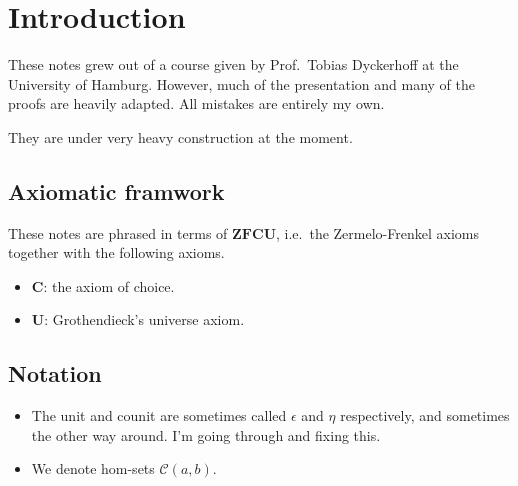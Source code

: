 \documentclass[main.tex]{subfiles}
\begin{document}
\chapter{Introduction}
\label{ch:introduction}

These notes grew out of a course given by Prof.\ Tobias Dyckerhoff at the University of Hamburg. However, much of the presentation and many of the proofs are heavily adapted. All mistakes are entirely my own.

They are under very heavy construction at the moment.

\section{Axiomatic framwork}
\label{sec:axiomatic_framwork}

These notes are phrased in terms of $\mathbf{ZFCU}$, i.e.\ the Zermelo-Frenkel axioms together with the following axioms.
\begin{itemize}
  \item $\mathbf{C}$: the axiom of choice.

  \item $\mathbf{U}$: Grothendieck's universe axiom.
\end{itemize}

\section{Notation}
\label{sec:notation}

\begin{itemize}
  \item The unit and counit are sometimes called $\epsilon$ and $\eta$ respectively, and sometimes the other way around. I'm going through and fixing this.

  \item We denote hom-sets $\mathcal{C}(a, b)$.
\end{itemize}
\end{document}

